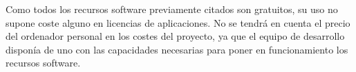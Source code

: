 Como todos los recursos software previamente citados son gratuitos, su uso no supone coste 
alguno en licencias de aplicaciones. No se tendrá en cuenta el precio del ordenador personal en 
los costes del proyecto, ya que el equipo de desarrollo disponía de uno con las capacidades 
necesarias para poner en funcionamiento los recursos software.

